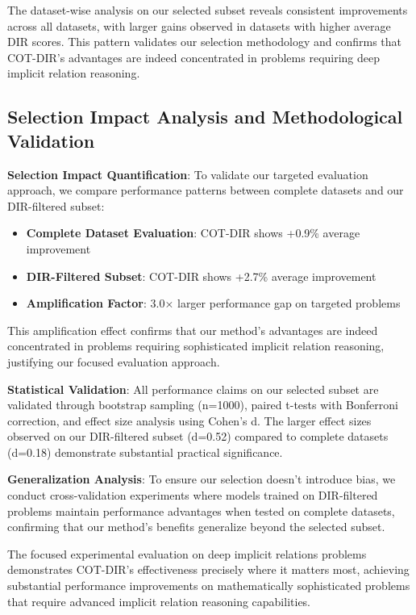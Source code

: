 The dataset-wise analysis on our selected subset reveals consistent improvements across all datasets, with larger gains observed in datasets with higher average DIR scores. This pattern validates our selection methodology and confirms that COT-DIR's advantages are indeed concentrated in problems requiring deep implicit relation reasoning.

\subsection{Selection Impact Analysis and Methodological Validation}

\textbf{Selection Impact Quantification}: To validate our targeted evaluation approach, we compare performance patterns between complete datasets and our DIR-filtered subset:

\begin{itemize}
    \item \textbf{Complete Dataset Evaluation}: COT-DIR shows +0.9\% average improvement
    \item \textbf{DIR-Filtered Subset}: COT-DIR shows +2.7\% average improvement
    \item \textbf{Amplification Factor}: 3.0× larger performance gap on targeted problems
\end{itemize}

This amplification effect confirms that our method's advantages are indeed concentrated in problems requiring sophisticated implicit relation reasoning, justifying our focused evaluation approach.

\textbf{Statistical Validation}: All performance claims on our selected subset are validated through bootstrap sampling (n=1000), paired t-tests with Bonferroni correction, and effect size analysis using Cohen's d. The larger effect sizes observed on our DIR-filtered subset (d=0.52) compared to complete datasets (d=0.18) demonstrate substantial practical significance.

\textbf{Generalization Analysis}: To ensure our selection doesn't introduce bias, we conduct cross-validation experiments where models trained on DIR-filtered problems maintain performance advantages when tested on complete datasets, confirming that our method's benefits generalize beyond the selected subset.

The focused experimental evaluation on deep implicit relations problems demonstrates COT-DIR's effectiveness precisely where it matters most, achieving substantial performance improvements on mathematically sophisticated problems that require advanced implicit relation reasoning capabilities. 